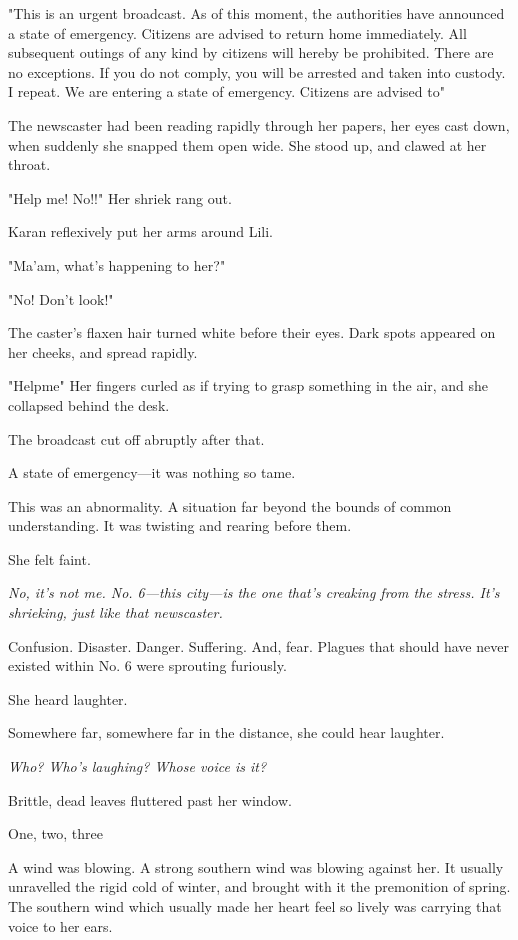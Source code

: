 "This is an urgent broadcast. As of this moment, the authorities have
announced a state of emergency. Citizens are advised to return home
immediately. All subsequent outings of any kind by citizens will hereby
be prohibited. There are no exceptions. If you do not comply, you will
be arrested and taken into custody. I repeat. We are entering a state of
emergency. Citizens are advised to\el "

The newscaster had been reading rapidly through her papers, her eyes
cast down, when suddenly she snapped them open wide. She stood up, and
clawed at her throat.

"Help me! No!!" Her shriek rang out.

Karan reflexively put her arms around Lili.

"Ma'am, what's happening to her?"

"No! Don't look!"

The caster's flaxen hair turned white before their eyes. Dark spots
appeared on her cheeks, and spread rapidly.

"Help\el me\el " Her fingers curled as if trying to grasp something in
the air, and she collapsed behind the desk.

The broadcast cut off abruptly after that.

A state of emergency---it was nothing so tame.

This was an abnormality. A situation far beyond the bounds of common
understanding. It was twisting and rearing before them.

She felt faint.

\emph{No, it's not me. No. 6---this city---is the one that's creaking from the
stress. It's shrieking, just like that newscaster.}

Confusion. Disaster. Danger. Suffering. And, fear. Plagues that should
have never existed within No. 6 were sprouting furiously.

She heard laughter.

Somewhere far, somewhere far in the distance, she could hear laughter.

\emph{Who? Who's laughing? Whose voice is it?}

Brittle, dead leaves fluttered past her window.

One, two, three\el 

A wind was blowing. A strong southern wind was blowing against her. It
usually unravelled the rigid cold of winter, and brought with it the
premonition of spring. The southern wind which usually made her heart
feel so lively was carrying that voice to her ears.

